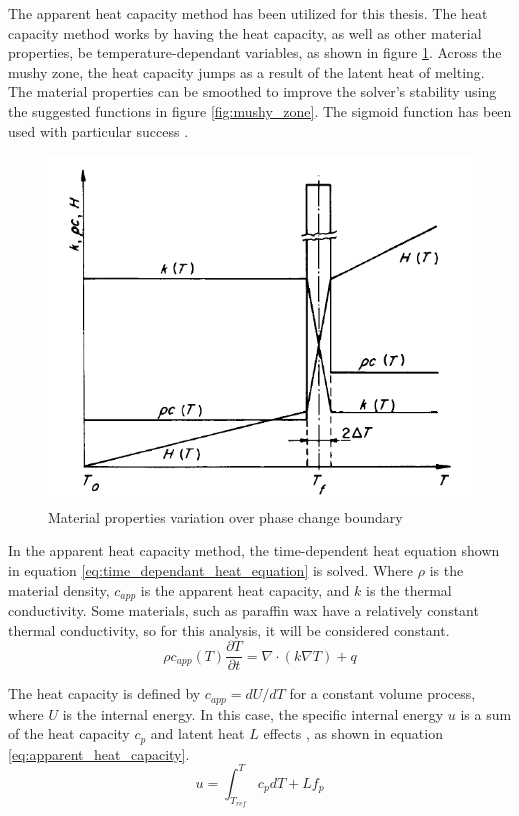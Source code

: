 The apparent heat capacity method \cite{Comini_DelGuidice_Lewis_Zienkiewicz_1974} has been utilized for this thesis. The heat capacity method works by having the heat capacity, as well as other material properties, be temperature-dependant variables, as shown in figure \ref{fig:material_properties_phase_change}. Across the mushy zone, the heat capacity jumps as a result of the latent heat of melting. The material properties can be smoothed to improve the solver's stability using the suggested functions in figure \ref{fig:mushy_zone}. The sigmoid function has been used with particular success \cite{Yang_He_2010}.
\begin{figure}[ht]
    \centering
    \includegraphics[width=0.6\linewidth]{figures/chapter_3/MaterialPropertiesOverPhaseChange.png}
    \caption{Material properties variation over phase change boundary \cite{Comini_DelGuidice_Lewis_Zienkiewicz_1974}}
    \label{fig:material_properties_phase_change}
\end{figure} 

In the apparent heat capacity method, the time-dependent heat equation shown in equation \ref{eq:time_dependant_heat_equation} is solved. Where $\rho$ is the material density, $c_{app}$ is the apparent heat capacity, and $k$ is the thermal conductivity. Some materials, such as paraffin wax have a relatively constant thermal conductivity, so for this analysis, it will be considered constant.
\begin{equation}
    \rho c_{app}(T) \frac{\partial T}{\partial t} = \nabla \cdot (k \nabla T) + q
    \label{eq:time_dependant_heat_equation}
\end{equation}

The heat capacity is defined by $c_{app}=dU/dT$ for a constant volume process, where $U$ is the internal energy. In this case, the specific internal energy $u$ is a sum of the heat capacity $c_p$ and latent heat $L$ effects \cite{Nallathambi_Specht_Bertram_2009}, as shown in equation \ref{eq:apparent_heat_capacity}.
\begin{equation}
    u = \int_{T_{ref}}^T c_p dT + L f_p
    \label{eq:apparent_heat_capacity}
\end{equation}

